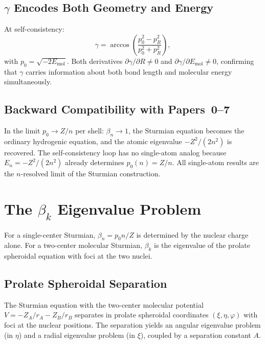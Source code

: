 \documentclass[aps,pra,twocolumn,superscriptaddress,longbibliography]{revtex4-2}
\begin{document}
\subsection{$\gamma$ Encodes Both Geometry and Energy}

At self-consistency:
\begin{equation}
\gamma = \arccos\!\left(\frac{p_0^2 - p_R^2}{p_0^2 + p_R^2}\right),
\label{eq:gamma_sc}
\end{equation}
with $p_0 = \sqrt{-2E_{\text{mol}}}$.  Both derivatives
$\partial\gamma/\partial R \neq 0$ and
$\partial\gamma/\partial E_{\text{mol}} \neq 0$, confirming that
$\gamma$ carries information about both bond length and molecular
energy simultaneously.

\subsection{Backward Compatibility with Papers~0--7}

In the limit $p_0 \to Z/n$ per shell: $\beta_n \to 1$, the Sturmian
equation becomes the ordinary hydrogenic equation, and the atomic
eigenvalue $-Z^2/(2n^2)$ is recovered.  The self-consistency loop has
no single-atom analog because $E_n = -Z^2/(2n^2)$ already determines
$p_0(n) = Z/n$.  All single-atom results are the $n$-resolved limit
of the Sturmian construction.


\section{The $\beta_k$ Eigenvalue Problem}
\label{sec:beta}

For a single-center Sturmian, $\beta_n = p_0 n/Z$ is determined by
the nuclear charge alone.  For a two-center molecular Sturmian, $\beta_k$
is the eigenvalue of the prolate spheroidal equation with foci at the
two nuclei.

\subsection{Prolate Spheroidal Separation}

The Sturmian equation with the two-center molecular potential
$V = -Z_A/r_A - Z_B/r_B$ separates in prolate spheroidal coordinates
$(\xi, \eta, \varphi)$ with foci at the nuclear positions.  The
separation yields an angular eigenvalue problem (in $\eta$) and a
radial eigenvalue problem (in $\xi$), coupled by a separation constant
$A$.
\end{document}
